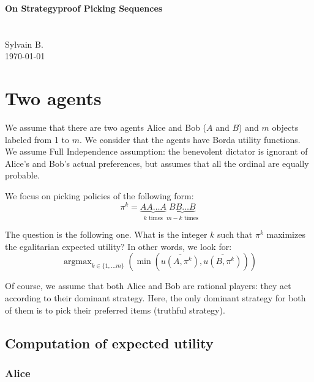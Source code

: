 \documentclass[a4paper, english, 10pt]{article}
\title{\@templatetitle}
\author{\@templateauthor}
\date{\@templatedate}
\makeatletter
\newcommand{\@templatetitle}{On Strategyproof Picking Sequences} %
\newcommand{\@templatesubtitle}{~}
\newcommand{\@templateauthor}{Sylvain B.} %
\newcommand{\@templatedate}{\today} %
\DeclareMathOperator{\argmax}{argmax}
\renewcommand{\maketitle}{
  \begin{center}
    {\LARGE\sffamily\bfseries \@templatetitle}\\\hrulefill\\
    {\large \@templatesubtitle}\\\vskip0.5cm
    \@templateauthor\\
    \@templatedate\\\vskip0.5cm
  \end{center}
}
\makeatother
\begin{document}
\renewcommand{\labelitemi}{\tikz\fill[rounded corners=1pt] (0, 0) -- (4pt, 2.5pt) -- (0pt, 5pt) -- cycle;}

\thispagestyle{plain}

\maketitle

\begin{abstract}
  This short note is about strategyproof picking sequences, namely,
  picking sequences where the agents pick all their objects in a row,
  in a serial dictatorship fashion. Hopefully, the computation of the
  fairest sequence is much easier in this case.
\end{abstract}


\section{Two agents}

We assume that there are two agents Alice and Bob ($A$ and $B$) and
$m$ objects labeled from 1 to $m$. We consider that the agents have
Borda utility functions. We assume Full Independence assumption: the
benevolent dictator is ignorant of Alice's and Bob's actual
preferences, but assumes that all the ordinal are equally probable.

We focus on picking policies of the following form:
\[
  \pi^k = \underbrace{AA \dots A}_{k \text{ times}}\underbrace{BB \dots B}_{m - k \text{ times}}
\]

The question is the following one. What is the integer $k$ such that
$\pi^k$ maximizes the egalitarian expected utility? In other words, we
look for:
\[
  \argmax_{k \in \{ 1, ... m \}}(\min(\overline{u(A, \pi^k)}, \overline{u(B, \pi^k)}))
\]

Of course, we assume that both Alice and Bob are rational players:
they act according to their dominant strategy. Here, the only dominant
strategy for both of them is to pick their preferred items (truthful
strategy).

\subsection{Computation of expected utility}

\subsubsection{Alice}
\end{document}
